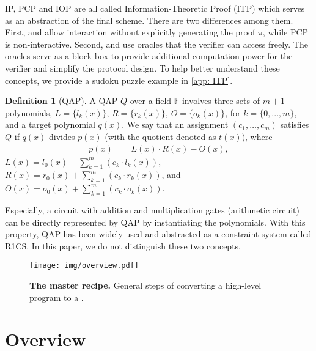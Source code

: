 \documentclass[letterpaper,twocolumn,10pt]{article}
\theoremstyle{definition}
\newtheorem{definition}{Definition}[section]
\newcommand{\zk}{\text{zk-SNARK}\xspace}
\newcommand{\PCP}{\text{PCP}\xspace}
\newcommand{\IOP}{\text{IOP}\xspace}
\newcommand{\IP}{\text{IP}\xspace}
\newcommand{\new}[1]{{#1}\xspace}
\begin{document}
\new{IP, PCP and IOP are all called Information-Theoretic Proof (ITP) which serves as an abstraction of the final \zk scheme. There are two differences among them. First, \IP and \IOP allow interaction without explicitly generating the proof $\pi$, while PCP is non-interactive. Second, \PCP and \IOP use oracles that the verifier can access freely. The oracles serve as a block box to provide additional computation power for the verifier and simplify the protocol design. To help better understand these concepts, we provide a sudoku puzzle example in \autoref{app: ITP}.
}

\new{
	\begin{definition}[QAP]\label{Def-QAP}
		A QAP $Q$ over a field $\mathbb{F}$ involves three sets of $m+1$ polynomials, $L=\{l_{k}(x)\}$, $R=\{r_{k}(x)\}$, $O=\{o_{k}(x)\}$, for $k=\{0,...,m\}$, and a target polynomial $q(x)$. We say that an assignment $(c_1,\ldots,c_m)$ satisfies $Q$ if $q(x)$ divides $p(x)$ (with the quotient denoted as $t(x)$), where
		\begin{equation}
			\begin{aligned}
				p(x)&=L(x)\cdot R(x)-O(x),
			\end{aligned}  
			\label{equ:qap}
		\end{equation}
		$L(x)=l_{0}(x)+\sum_{k=1}^{m}(c_{k}\cdot l_{k}(x))$, $R(x)=r_{0}(x)+\sum_{k=1}^{m}(c_{k}\cdot r_{k}(x))$, and $O(x)=o_{0}(x)+\sum_{k=1}^m(c_{k}\cdot o_{k}(x))$.
	\end{definition}
}

\new{Especially, a circuit with addition and multiplication gates (arithmetic circuit) can be directly represented by QAP by instantiating the polynomials. With this property, QAP has been widely used and abstracted as a constraint system called R1CS. In this paper, we do not distinguish these two concepts.}


\begin{figure*}[t]
	\centering
	\texttt{[image: img/overview.pdf]}
	\caption{\textbf{The master recipe.} General steps of converting a high-level program to a \zk.}
	\label{fig:overview}
\end{figure*}

\section{Overview}
\label{sec:overview}
\end{document}
